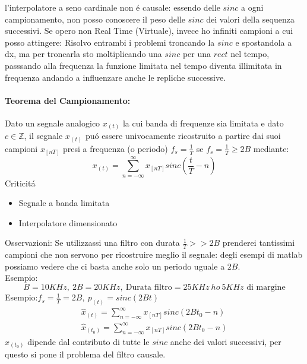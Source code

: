             l'interpolatore a seno cardinale non é causale: essendo delle $sinc$ a ogni campionamento, non posso conoscere il peso delle $sinc$ 
            dei valori della sequenza successivi. Se opero non Real Time (Virtuale), invece ho infiniti campioni a cui posso attingere: Risolvo entrambi i 
            problemi troncando la $sinc$ e spostandola a dx, ma per troncarla sto moltiplicando una $sinc$ per una $rect$ nel tempo, passsando alla frequenza 
            la funzione limitata nel tempo diventa illimitata in frequenza andando a influenzare anche le repliche successive.


        
        \paragraph{Teorema del Campionamento:} Dato un segnale analogico $x_{(t)}$ la cui banda di frequenze sia limitata e dato $c\in \mathbb{Z}$,
        il segnale $x_{(t)}$ puó essere univocamente ricostruito a partire dai suoi campioni $x_{[nT]}$ presi a frequenza (o periodo) $f_s = \frac{1}{T}$ se 
        $f_s = \frac{1}{T} \geq 2B$ mediante:
        \[
            x_{(t)} = \sum_{n=-\infty}^{\infty} x_{[nT]}sinc\left(\frac{t}{T}-n\right) 
        \]
        Criticitá
        \begin{itemize}
            \item {Segnale a banda limitata}
            \item {Interpolatore dimensionato}
        \end{itemize}
        Osservazioni: Se utilizzassi una filtro con durata $\frac{1}{T}>>2B$ prenderei tantissimi campioni che
        non servono per ricostruire meglio il segnale: degli esempi di matlab possiamo vedere che ci basta anche solo un periodo uguale a $2B$.\\
        Esempio:
        \[
            B = 10KHz,\ 2B = 20KHz,\ \text{Durata filtro} = 25KHz\ ho\ 5KHz\text{ di margine}
        \]
        Esempio:$f_s = \frac{1}{T} = 2B,\ p_{(t)}=sinc(2Bt)$
        \begin{gather}
                \hat{x}_{(t)} = \sum_{n=-\infty}^{\infty} x_{[nT]}sinc\left(2Bt_0 -n\right) \nonumber \\
                \hat{x}_{(t_0)} = \sum_{n=-\infty}^{\infty} x_{[nT]}sinc\left(2Bt_0 -n\right) \nonumber
        \end{gather}
        $\hat{x}_{(t_0)}$ dipende dal contributo di tutte le $sinc$ anche dei valori successivi, per questo si pone il problema del filtro causale. 

